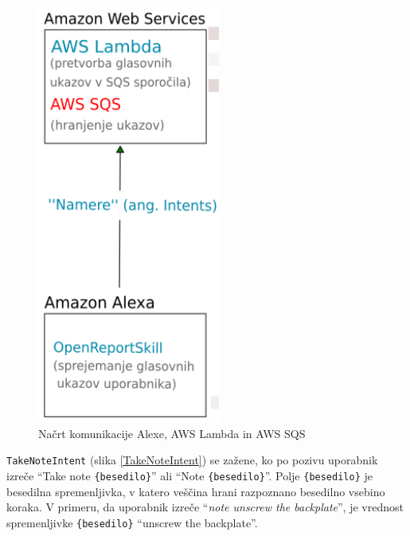 \documentclass[a4paper, 12pt]{book}
\begin{document}
\begin{figure}[H]
\begin{center}
\includegraphics[width=6cm]{plan_alexa_sqs}
\end{center}
\caption{Načrt komunikacije Alexe, AWS Lambda in AWS SQS}
\label{plan_alexa_sqs}
\end{figure}

\texttt{TakeNoteIntent} (slika \ref{TakeNoteIntent}) se zažene, ko po pozivu uporabnik izreče \enquote{Take note \texttt{\{besedilo\}}} ali \enquote{Note \texttt{\{besedilo\}}}.
Polje \texttt{\{besedilo\}} je besedilna spremenljivka, v katero veščina hrani razpoznano besedilno vsebino koraka.
V primeru, da uporabnik izreče \enquote{\textit{note unscrew the backplate}}, je vrednost spremenljivke \texttt{\{besedilo\}} \enquote{unscrew the backplate}.
\end{document}
